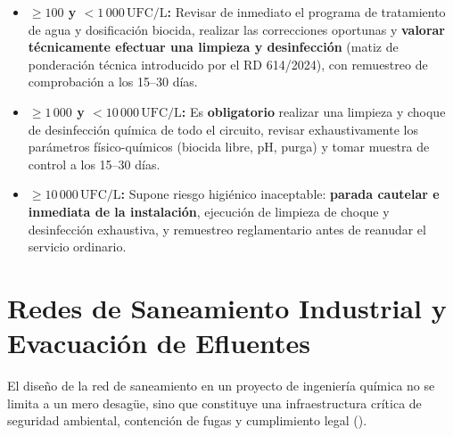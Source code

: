 \documentclass{report}
\begin{document}
\begin{itemize}
\begin{itemize}
        \item \textbf{$\ge 100$ y $< 1\,000\,\text{UFC/L}$:} Revisar de inmediato el programa de tratamiento de agua y dosificación biocida, realizar las correcciones oportunas y \textbf{valorar técnicamente efectuar una limpieza y desinfección} (matiz de ponderación técnica introducido por el RD 614/2024), con remuestreo de comprobación a los 15--30 días.
        \item \textbf{$\ge 1\,000$ y $< 10\,000\,\text{UFC/L}$:} Es \textbf{obligatorio} realizar una limpieza y choque de desinfección química de todo el circuito, revisar exhaustivamente los parámetros físico-químicos (biocida libre, pH, purga) y tomar muestra de control a los 15--30 días.
        \item \textbf{$\ge 10\,000\,\text{UFC/L}$:} Supone riesgo higiénico inaceptable: \textbf{parada cautelar e inmediata de la instalación}, ejecución de limpieza de choque y desinfección exhaustiva, y remuestreo reglamentario antes de reanudar el servicio ordinario.
    \end{itemize}
\end{itemize}

\section{Redes de Saneamiento Industrial y Evacuación de Efluentes}

El diseño de la red de saneamiento en un proyecto de ingeniería química no se limita a un mero desagüe, sino que constituye una infraestructura crítica de seguridad ambiental, contención de fugas y cumplimiento legal (\cite{UNE_EN_752, CTE_DB_HS5}).
\end{document}
